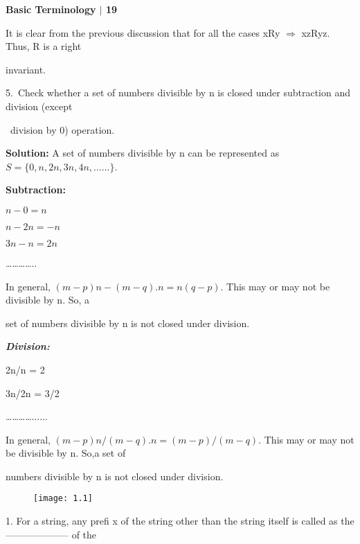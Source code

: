 \documentclass[10pt,a4paper]{article}
\begin{document}
\scriptsize

\begin{flushright}
\textsf{\textbf{Basic Terminology $|$ 19}}
\end{flushright}

It is clear from the previous discussion that for all the cases xRy $\Rightarrow$ xzRyz. Thus, R is a right

invariant.

\begin{flushleft}
  5.\, Check whether a set of numbers divisible by n is closed under subtraction and division (except

\quad\, division by 0) operation.
\end{flushleft}

\textsf{\textbf{Solution:}} A set of numbers divisible by n can be represented as $S = \{0, n, 2n, 3n, 4n,……\}$.

\textsf{\textbf{Subtraction:}}

\begin{center}
  $ n - 0 = n $

  $n - 2n =  -n$

  $3n - n = 2n$

  …………..
\end{center}

In general, $(m - p)n-(m-q).n = n(q-p)$. This may or may not be divisible by n. So, a

set of numbers divisible by n is not closed under division.

\qquad \tiny
\qquad

\textsl{\textbf{Division:}}

\begin{center}
2n/n = 2

3n/2n = 3/2

…………......
\end{center}

In general, $(m - p)n/(m-q).n = (m-p)/(m-q)$. This may or may not be divisible by n. So,a set of

numbers divisible by n is not closed under division.

\begin{figure}[h]
  \centering
  \texttt{[image: 1.1]}\\
\end{figure}

1. For a string, any prefi x of the string other than the string itself is called as the -------------------- of the
\end{document}
